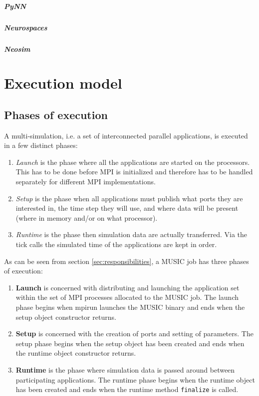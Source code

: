 \documentclass[a4paper]{report}
\begin{document}
\paragraph{PyNN}

\paragraph{Neurospaces}

\paragraph{Neosim}


\chapter{Execution model}

\section{Phases of execution}

A multi-simulation, i.e. a set of interconnected parallel
applications, is executed in a few distinct phases:
\begin{enumerate}
\item \emph{Launch} is the phase where all the applications are
  started on the processors.  This has to be done before MPI is
  initialized and therefore has to be handled separately for different
  MPI implementations.
\item \emph{Setup} is the phase when all applications must publish
  what ports they are interested in, the time step they will use, and
  where data will be present (where in memory and/or on what processor).
\item \emph{Runtime} is the phase then simulation data are actually
  transferred.  Via the tick calls the simulated time of the
  applications are kept in order.
\end{enumerate}

As can be seen from section \ref{sec:responsibilities}, a MUSIC job
has three phases of execution:
\begin{enumerate}
  \item \textbf{Launch} is concerned with distributing and launching
    the application set within the set of MPI processes allocated to
    the MUSIC job.  The launch phase begins when mpirun launches the
    MUSIC binary and ends when the setup object constructor returns.
  \item \textbf{Setup} is concerned with the creation of ports and
    setting of parameters.  The setup phase begins when the setup
    object has been created and ends when the runtime object
    constructor returns.
  \item \textbf{Runtime} is the phase where simulation data is passed
    around between participating applications.  The runtime phase
    begins when the runtime object has been created and ends when the
    runtime method \verb|finalize| is called.
\end{enumerate}
\end{document}
